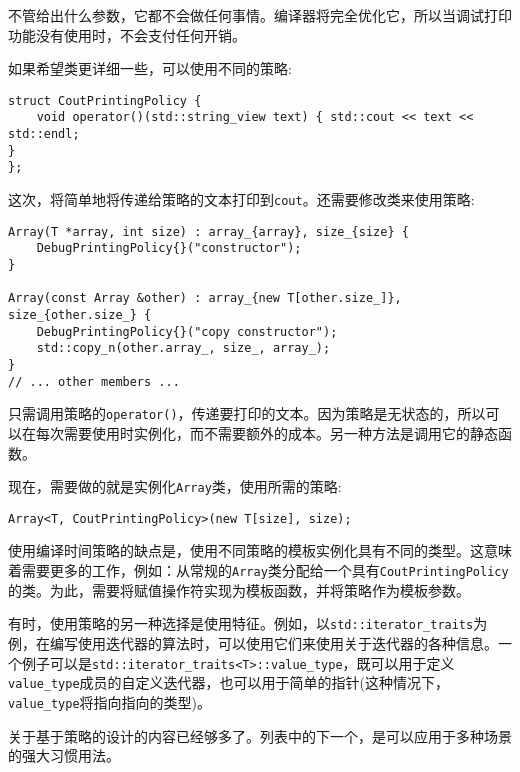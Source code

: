 不管给出什么参数，它都不会做任何事情。编译器将完全优化它，所以当调试打印功能没有使用时，不会支付任何开销。

如果希望类更详细一些，可以使用不同的策略:

\begin{lstlisting}[style=styleCXX]
struct CoutPrintingPolicy {
	void operator()(std::string_view text) { std::cout << text << std::endl;
}
};
\end{lstlisting}

这次，将简单地将传递给策略的文本打印到\texttt{cout}。还需要修改类来使用策略:

\begin{lstlisting}[style=styleCXX]
Array(T *array, int size) : array_{array}, size_{size} {
	DebugPrintingPolicy{}("constructor");
}

Array(const Array &other) : array_{new T[other.size_]},
size_{other.size_} {
	DebugPrintingPolicy{}("copy constructor");
	std::copy_n(other.array_, size_, array_);
}
// ... other members ...
\end{lstlisting}

只需调用策略的\texttt{operator()}，传递要打印的文本。因为策略是无状态的，所以可以在每次需要使用时实例化，而不需要额外的成本。另一种方法是调用它的静态函数。

现在，需要做的就是实例化\texttt{Array}类，使用所需的策略:

\begin{lstlisting}[style=styleCXX]
Array<T, CoutPrintingPolicy>(new T[size], size);
\end{lstlisting}

使用编译时间策略的缺点是，使用不同策略的模板实例化具有不同的类型。这意味着需要更多的工作，例如：从常规的\texttt{Array}类分配给一个具有\texttt{CoutPrintingPolicy}的类。为此，需要将赋值操作符实现为模板函数，并将策略作为模板参数。

有时，使用策略的另一种选择是使用特征。例如，以\texttt{std::iterator\_traits}为例，在编写使用迭代器的算法时，可以使用它们来使用关于迭代器的各种信息。一个例子可以是\texttt{std::iterator\_traits<T>::value\_type}，既可以用于定义\texttt{value\_type}成员的自定义迭代器，也可以用于简单的指针(这种情况下，\texttt{value\_type}将指向指向的类型)。

关于基于策略的设计的内容已经够多了。列表中的下一个，是可以应用于多种场景的强大习惯用法。








